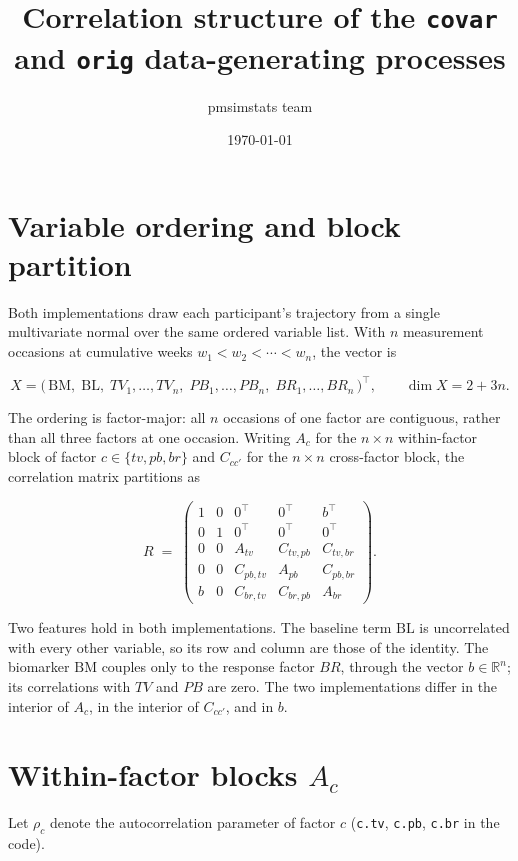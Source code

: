 \documentclass[11pt]{article}
\title{Correlation structure of the \texttt{covar} and \texttt{orig}
data-generating processes}
\author{pmsimstats team}
\date{\today}
\newcommand{\bm}{\mathrm{BM}}
\newcommand{\bl}{\mathrm{BL}}
\begin{document}
\maketitle

\section{Variable ordering and block partition}

Both implementations draw each participant's trajectory from a single
multivariate normal over the same ordered variable list. With $n$
measurement occasions at cumulative weeks
$w_1 < w_2 < \cdots < w_n$, the vector is

\[
X = \bigl(\,\bm,\; \bl,\;
TV_1,\dots,TV_n,\;
PB_1,\dots,PB_n,\;
BR_1,\dots,BR_n \,\bigr)^{\!\top},
\qquad \dim X = 2 + 3n .
\]

The ordering is factor-major: all $n$ occasions of one factor are
contiguous, rather than all three factors at one occasion. Writing
$A_c$ for the $n \times n$ within-factor block of factor
$c \in \{tv, pb, br\}$ and $C_{cc'}$ for the $n \times n$
cross-factor block, the correlation matrix partitions as

\[
R \;=\;
\begin{pmatrix}
1 & 0 & 0^{\top} & 0^{\top} & b^{\top} \\[2pt]
0 & 1 & 0^{\top} & 0^{\top} & 0^{\top} \\[2pt]
0 & 0 & A_{tv}   & C_{tv,pb} & C_{tv,br} \\[2pt]
0 & 0 & C_{pb,tv} & A_{pb}   & C_{pb,br} \\[2pt]
b & 0 & C_{br,tv} & C_{br,pb} & A_{br}
\end{pmatrix}.
\]

Two features hold in both implementations. The baseline term $\bl$ is
uncorrelated with every other variable, so its row and column are
those of the identity. The biomarker $\bm$ couples only to the
response factor $BR$, through the vector $b \in \mathbb{R}^{n}$; its
correlations with $TV$ and $PB$ are zero. The two implementations
differ in the interior of $A_c$, in the interior of $C_{cc'}$, and in
$b$.

\section{Within-factor blocks $A_c$}

Let $\rho_c$ denote the autocorrelation parameter of factor $c$
(\texttt{c.tv}, \texttt{c.pb}, \texttt{c.br} in the code).
\end{document}
